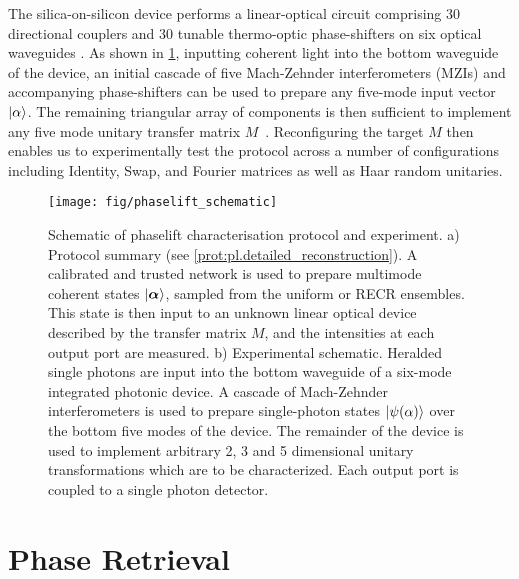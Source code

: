 The silica-on-silicon device performs a linear-optical circuit comprising 30 directional couplers and 30 tunable thermo-optic phase-shifters on six optical waveguides \cite{Carolan_2015_Universal}.
As shown in \cref{fig:experimental.schematic}, inputting coherent light into the bottom waveguide of the device, an initial cascade of five Mach-Zehnder interferometers (MZIs) and accompanying phase-shifters can be used to prepare any five-mode input vector $\ket{{\alpha}}$.
The remaining triangular array of components is then sufficient to implement any five mode unitary transfer matrix $M$~\cite{Reck_1994_Experimental}.
Reconfiguring the target $M$ then enables us to experimentally test the protocol across a number of configurations including Identity, Swap, and Fourier matrices as well as Haar random unitaries.

\begin{figure*}[tbp]
  \centering
  \texttt{[image: fig/phaselift\_schematic]}%
  \caption{%
    Schematic of phaselift characterisation protocol and experiment.
     a) Protocol summary (see \cref{prot:pl.detailed_reconstruction}).
     A calibrated and trusted network is used to prepare multimode coherent states ${|{\boldsymbol{\alpha}}\rangle}$, sampled from the uniform or RECR ensembles.
     This state is then input to an unknown linear optical device described by the transfer matrix $ M$, and the intensities at each output port are measured.
     b) Experimental schematic.
     Heralded single photons are input into the bottom waveguide of a six-mode integrated photonic device.
     A cascade of Mach-Zehnder interferometers is used to prepare single-photon states ${|{\psi( \alpha)}\rangle}$ over the bottom five modes of the device.
     The remainder of the device is used to implement arbitrary 2, 3 and 5 dimensional unitary transformations which are to be characterized.
     Each output port is coupled to a single photon detector.
   }
  \label{fig:experimental.schematic}
\end{figure*}

\section{Phase Retrieval}%
\label{sec:pl.phase_retrieval}

